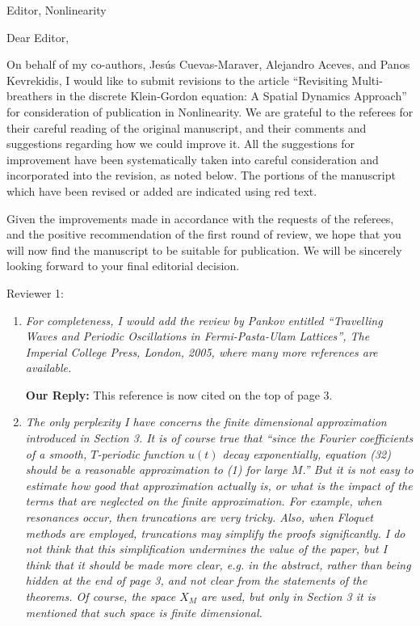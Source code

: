 \documentclass[11pt]{letter}
\begin{document}
\address{Ross Parker \\
Department of Mathematics \\
Southern Methodist University \\
Dallas, TX 75275 \\
\texttt{rhparker@smu.edu}}%
\signature{Ross Parker}
\begin{letter}{Editor, Nonlinearity}

\opening{Dear Editor,}

On behalf of my co-authors, Jes\'us Cuevas-Maraver, Alejandro Aceves, and Panos Kevrekidis, I would like to submit revisions to the article ``Revisiting Multi-breathers in the discrete Klein-Gordon equation: A Spatial Dynamics Approach'' for consideration of publication in Nonlinearity. We are grateful to the referees for their careful reading of the original manuscript, and their comments and suggestions regarding how we could improve it. All the suggestions for improvement have been systematically taken into careful consideration and incorporated into the revision, as noted below. The portions of the manuscript which have been revised or added are indicated using red text. 

Given the improvements made in accordance with the requests of the referees, and the positive recommendation of the first round
of review, we hope that you will now find the manuscript to be suitable for publication. We will be sincerely looking forward to your final editorial decision.


Reviewer 1:
\begin{enumerate}
    \item \emph{For completeness, I would add the review by Pankov entitled ``Travelling Waves and Periodic Oscillations in Fermi-Pasta-Ulam Lattices'', The Imperial College Press, London, 2005, where many more references are available.} 
 
 {\bf Our Reply:}   This reference is now cited on the top of page 3.
    \vspace{4mm}

    \item \emph{The only perplexity I have concerns the finite dimensional approximation introduced in Section 3. It is of course true that ``since the Fourier coefficients of a smooth, $T$-periodic function $u(t)$ decay exponentially, equation (32) should be a reasonable approximation to (1) for large $M$.'' But it is not easy to estimate how good that approximation actually is, or what is the impact of the terms that are neglected on the finite approximation. For example, when resonances occur, then truncations are very tricky. Also, when Floquet methods are employed, truncations may simplify the proofs significantly. I do not think that this simplification undermines the value of the paper, but I think that it should be made more clear, e.g. in the abstract, rather than being hidden at the end of page 3, and not clear from the statements of the theorems. Of course, the space $X_M$ are used, but only in Section 3 it is mentioned that such space is finite dimensional.}
    

\end{enumerate}
\end{letter}
\end{document}
